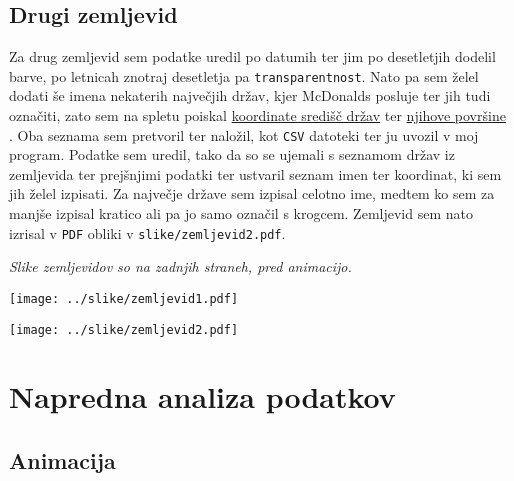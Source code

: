 \documentclass[hidelinks, 11pt,a4paper]{article}
\begin{document}
\subsection{Drugi zemljevid}
Za drug zemljevid sem podatke uredil po datumih ter jim po desetletjih dodelil barve, po letnicah znotraj desetletja pa \verb|transparentnost|. Nato pa sem želel dodati še imena nekaterih največjih držav, kjer McDonalds posluje ter jih tudi označiti, zato sem na spletu poiskal \href{https://developers.google.com/public-data/docs/canonical/countries_csv}{koordinate središč držav} \cite{bib:koordinate} ter \href{http://simple.wikipedia.org/wiki/List_of_countries_by_area}{njihove površine} \cite{bib:povrsine}. Oba seznama sem pretvoril ter naložil, kot \verb|CSV| datoteki ter ju uvozil v moj program. Podatke sem uredil, tako da so se ujemali s seznamom držav iz zemljevida ter prejšnjimi podatki ter ustvaril seznam imen ter koordinat, ki sem jih želel izpisati. Za največje države sem izpisal celotno ime, medtem ko sem za manjše izpisal kratico ali pa jo samo označil s krogcem. Zemljevid sem nato izrisal v \verb|PDF| obliki v \verb|slike/zemljevid2.pdf|. \par
\vspace{1em}
\noindent
\textit{Slike zemljevidov so na zadnjih straneh, pred animacijo.}
 
\begin{sidewaysfigure}[ht]
	\texttt{[image: ../slike/zemljevid1.pdf]}
\end{sidewaysfigure}



\begin{sidewaysfigure}[ht]
	\texttt{[image: ../slike/zemljevid2.pdf]}
\end{sidewaysfigure}

\newpage

\section{Napredna analiza podatkov}

\subsection{Animacija}
\end{document}
